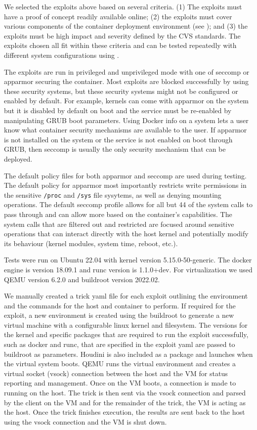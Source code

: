 We selected the exploits above based on several criteria. (1) The exploits must have a proof of concept readily available online; (2) the exploits must cover various components of the container deployment environment (see ); and (3) the exploits must be high impact and severity defined by the CVS standards. The exploits chosen all fit within these criteria and can be tested repeatedly with different system configurations using \houdini.

The exploits are run in privileged and unprivileged mode with one of seccomp or apparmor securing the container. Most exploits are blocked successfully by using these security systems, but these security systems might not be configured or enabled by default. For example, kernels can come with apparmor on the system but it is disabled by default on boot and the service must be re-enabled by manipulating GRUB boot parameters. Using Docker info on a system lets a user know what container security mechanisms are available to the user. If apparmor is not installed on the system or the service is not enabled on boot through GRUB, then seccomp is usually the only security mechanism that can be deployed.

The default policy files for both apparmor and seccomp are used during testing. The default policy for apparmor most importantly restricts write permissions in the sensitive \texttt{/proc} and \texttt{/sys} file sysytems, as well as denying mounting operations. The default seccomp profile allows for all but 44 of the system calls to pass through and can allow more based on the container's capabilities. The system calls that are filtered out and restricted are focused around sensitive operations that can interact directly with the host kernel and potentially modify its behaviour (kernel modules, system time, reboot, etc.).

Tests were run on Ubuntu 22.04 with kernel version 5.15.0-50-generic. The docker engine is version 18.09.1 and runc version is 1.1.0+dev. For virtualization we used QEMU version 6.2.0 and buildroot version 2022.02.

We manually created a trick yaml file for each exploit outlining the environment and the commands for the host and container to perform. If required for the exploit, a new environment is created using the buildroot to generate a new virtual machine with a configurable linux kernel and filesystem. The versions for the kernel and specific packages that are required to run the exploit successfully, such as docker and runc, that are specified in the exploit yaml are passed to buildroot as parameters. Houdini is also included as a package and launches when the virtual system boots. QEMU runs the virtual environment and creates a virtual socket (vsock) connection between the host and the VM for status reporting and management. Once \houdini on the VM boots, a connection is made to \houdini running on the host. The trick is then sent via the vsock connection and parsed by the \houdini client on the VM and for the remainder of the trick, the VM is acting as the host. Once the trick finishes execution, the results are sent back to the host \houdini using the vsock connection and the VM is shut down.

